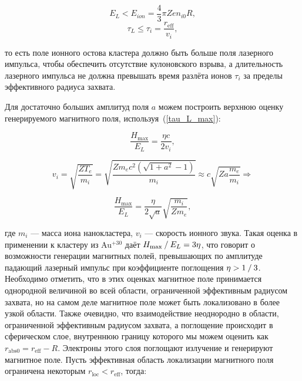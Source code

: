     \begin{equation}
        E_L < E_{ion} = \frac{4}{3} \pi Z e n_{i0} R,
        \label{E_L_limit}
    \end{equation}
    \begin{equation}
        \tau_L \leq \tau_i = \frac{r_{\textrm{eff}}}{v_i},
        \label{tau_L_max}
    \end{equation}

\noindent то есть поле ионного остова кластера должно быть больше поля лазерного импульса, чтобы обеспечить отсутствие кулоновского взрыва, а длительность лазерного импульса не должна превышать время разлёта ионов $\tau_i$ за пределы эффективного радиуса захвата.

Для достаточно больших амплитуд поля $a$ можем построить верхнюю оценку генерируемого магнитного поля, используя~(\ref{tau_L_max}):

    \begin{equation}
        \frac{H_{\max}}{E_L} = \frac{\eta c}{2 v_i},
    \end{equation}

    \begin{equation}
        v_i = \sqrt{\frac{Z T_e}{m_i}} = \sqrt{\frac{Z m_e c^2 \left( \sqrt{1 + a^2} - 1 \right)}{m_i}} \approx c \sqrt{Z a \frac{m_e}{m_i}} \Rightarrow
    \end{equation}

    \begin{equation}
        \frac{H_{\max}}{E_L} = \frac{\eta}{2 \sqrt{a}} \sqrt{\frac{m_i}{Z m_e}},
        \label{H_max_plat}
    \end{equation}

\noindent где $m_i$ --- масса иона нанокластера, $v_i$ --- скорость ионного звука. Такая оценка в применении к кластеру из Au$^{+30}$ даёт ${H_{\max}}\:/\:{E_L} = 3 \eta$, что говорит о возможности генерации магнитных полей, превышающих по амплитуде падающий лазерный импульс при коэффициенте поглощения $\eta > {1}\:/\:{3}$. Необходимо отметить, что в этих оценках магнитное поле принимается однородной величиной во всей области, ограниченной эффективным радиусом захвата, но на самом деле магнитное поле может быть локализовано в более узкой области. Также очевидно, что взаимодействие неоднородно в области, ограниченной эффективным радиусом захвата, а поглощение происходит в сферическом слое, внутреннюю границу которого мы можем оценить как $r_{\textrm{abs}0} = r_{\textrm{eff}} - R$. Электроны этого слоя поглощают излучение и генерируют магнитное поле. Пусть эффективная область локализации магнитного поля ограничена некоторым $r_{\textrm{loc}} < r_{\textrm{eff}}$, тогда:

